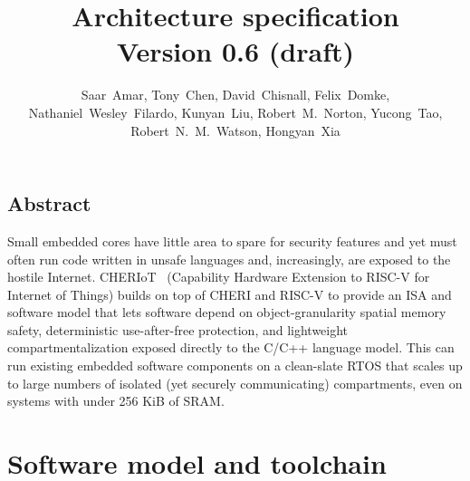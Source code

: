 \documentclass[12pt,letterpaper,twoside,openright,fleqn]{report}
\begin{document}
\title{\cherimcu{} Architecture specification\\
  Version 0.6 (draft)}
\author{
  \parbox{\linewidth}{\centering%
    Saar~Amar,
    Tony~Chen,
    David~Chisnall,
    Felix~Domke,
    Nathaniel~Wesley~Filardo,
    Kunyan~Liu,
    Robert~M.~Norton,
    Yucong~Tao,
    Robert~N.~M.~Watson,
    Hongyan~Xia
  }%
}

\begin{minipage}[h]{\textwidth}
  \vspace{-.2cm}
  \maketitle
\end{minipage}

\normalsize


\clearpage

\chapter*{Abstract}

Small embedded cores have little area to spare for security features and yet must often run code written in unsafe languages and, increasingly, are exposed to the hostile Internet.
CHERIoT  (Capability Hardware Extension to RISC-V for Internet of Things) builds on top of CHERI and RISC-V to provide an ISA and software model that lets software depend on object-granularity spatial memory safety, deterministic use-after-free protection, and lightweight compartmentalization exposed directly to the C/C++ language model.
This can run existing embedded software components on a clean-slate RTOS that scales up to large numbers of isolated (yet securely communicating) compartments, even on systems with under 256 KiB of SRAM.

\clearpage



\clearpage



\clearpage



\clearpage

\tableofcontents

\part{Software model and toolchain}
\label{part:sw}
\end{document}
